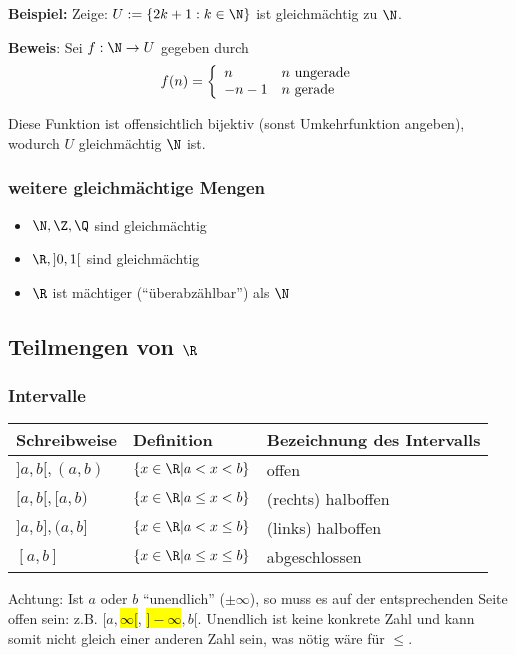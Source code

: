 \textbf{Beispiel:}
Zeige: $U := \{ 2k + 1: k \in \N \}$ ist gleichmächtig zu $\N$.

\textbf{Beweis}: Sei $f: \N \rightarrow U$ gegeben durch
\begin{equation*}
f(n) = \left\{
	\begin{array}{l l}
		n & n \text{ ungerade}\\
		-n - 1 & n \text{ gerade}
	\end{array}
\right.
\end{equation*}

Diese Funktion ist offensichtlich bijektiv (sonst Umkehrfunktion angeben), wodurch $U$ gleichmächtig $\N$ ist.

\subsubsection{weitere gleichmächtige Mengen}
\begin{itemize}
	\item $\N, \Z, \Q$ sind gleichmächtig
	\item $\R, ]0,1[$ sind gleichmächtig
	\item $\R$ ist mächtiger (``überabzählbar'') als $\N$
\end{itemize}

\subsection{Teilmengen von $\R$}
\subsubsection{Intervalle}
\begin{tabular}{|l|l|l|}\hline
Schreibweise & Definition & Bezeichnung des Intervalls\\\hline
$]a, b[, (a,b)$ & $\{x \in \R | a < x < b\}$ & offen\\\hline
$[a, b[, [a, b)$ & $\{x \in \R | a \leq x < b\}$ & (rechts) halboffen \\\hline
$]a,b], (a, b]$ & $\{x \in \R | a < x \leq b\}$ & (links) halboffen \\\hline
$[a,b]$ & $\{x \in \R | a \leq x \leq b\}$ & abgeschlossen \\\hline
\end{tabular}

Achtung: Ist $a$ oder $b$ ``unendlich'' ($\pm \infty$), so muss es auf der entsprechenden Seite offen sein: z.B. $[a, $\hl{$\infty[$}, \hl{$]-\infty$}$, b[$.
Unendlich ist keine konkrete Zahl und kann somit nicht gleich einer anderen Zahl sein, was nötig wäre für $\leq$.
\pagebreak

